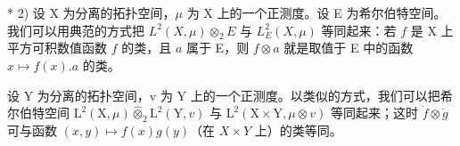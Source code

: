 * 2) 设 X 为分离的拓扑空间，\(\mu\) 为 X 上的一个正测度。设 E 为希尔伯特空间。我们可以用典范的方式把 \(L^2(X, \mu) \otimes_2 E\) 与 \(L_E^2(X, \mu)\) 等同起来：若 \(f\) 是 X 上平方可积数值函数 \(f\) 的类，且 \(a\) 属于 E，则 \(f \otimes a\) 就是取值于 E 中的函数 \(x \mapsto f(x).a\) 的类。

设 Y 为分离的拓扑空间，v 为 Y 上的一个正测度。以类似的方式，我们可以把希尔伯特空间 \(\mathrm{L}^{2}(\mathrm{X},\mu)\hat{\otimes}_{2}\mathrm{L}^{2}(\mathrm{Y},v)\) 与 \(\mathrm{L}^{2}(\mathrm{X}\times\mathrm{Y},\mu\otimes v)\) 等同起来；这时 \(\dot{f}\otimes\dot{g}\) 可与函数 \((x,y)\mapsto f(x)g(y)\)（在 \(X\times Y\) 上）的类等同。

